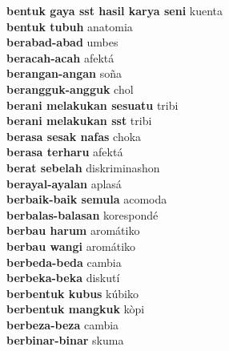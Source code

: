 \textbf{ bentuk gaya sst hasil karya seni  } kuenta \\
\textbf{ bentuk tubuh  } anatomia \\
\textbf{ berabad-abad  } umbes \\
\textbf{ beracah-acah  } afektá \\
\textbf{ berangan-angan  } soña \\
\textbf{ berangguk-angguk  } chol \\
\textbf{ berani melakukan sesuatu  } tribi \\
\textbf{ berani melakukan sst  } tribi \\
\textbf{ berasa sesak nafas  } choka \\
\textbf{ berasa terharu  } afektá \\
\textbf{ berat sebelah  } diskriminashon \\
\textbf{ berayal-ayalan  } aplasá \\
\textbf{ berbaik-baik semula  } acomoda \\
\textbf{ berbalas-balasan  } korespondé \\
\textbf{ berbau harum  } aromátiko \\
\textbf{ berbau wangi  } aromátiko \\
\textbf{ berbeda-beda  } cambia \\
\textbf{ berbeka-beka  } diskutí \\
\textbf{ berbentuk kubus  } kúbiko \\
\textbf{ berbentuk mangkuk  } kòpi \\
\textbf{ berbeza-beza  } cambia \\
\textbf{ berbinar-binar  } skuma \\
